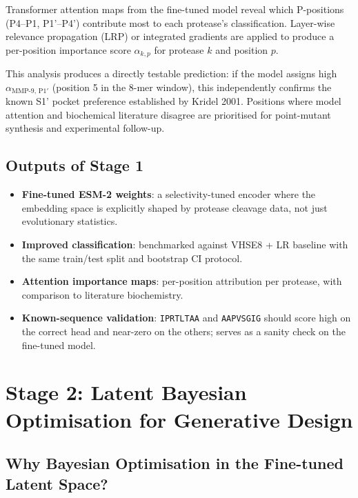 \documentclass[10pt,a4paper]{article}
\newcommand{\seq}[1]{\texttt{#1}}
\begin{document}
Transformer attention maps from the fine-tuned model reveal which P-positions
(P4--P1, P1'--P4') contribute most to each protease's classification.
Layer-wise relevance propagation (LRP) or integrated gradients are applied
to produce a per-position importance score $\alpha_{k,p}$ for protease $k$
and position $p$.

This analysis produces a directly testable prediction: if the model assigns
high $\alpha_{\text{MMP-9},\,\text{P1}'}$ (position 5 in the 8-mer window),
this independently confirms the known S1' pocket preference established by
Kridel 2001.  Positions where model attention and biochemical literature
disagree are prioritised for point-mutant synthesis and experimental follow-up.

\subsection{Outputs of Stage 1}

\begin{itemize}[topsep=2pt,itemsep=1pt,leftmargin=*]
  \item \textbf{Fine-tuned ESM-2 weights}: a selectivity-tuned encoder where
    the embedding space is explicitly shaped by protease cleavage data, not
    just evolutionary statistics.
  \item \textbf{Improved classification}: benchmarked against VHSE8 + LR
    baseline with the same train/test split and bootstrap CI protocol.
  \item \textbf{Attention importance maps}: per-position attribution per
    protease, with comparison to literature biochemistry.
  \item \textbf{Known-sequence validation}: \seq{IPRTLTAA} and \seq{AAPVSGIG}
    should score high on the correct head and near-zero on the others; serves
    as a sanity check on the fine-tuned model.
\end{itemize}

\section{Stage 2: Latent Bayesian Optimisation for Generative Design}

\subsection{Why Bayesian Optimisation in the Fine-tuned Latent Space?}
\end{document}
